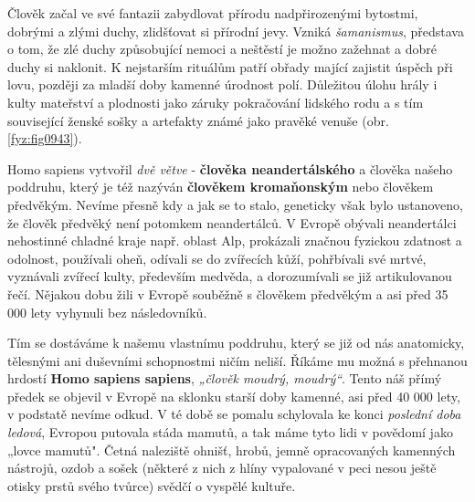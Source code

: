         Člověk začal ve své fantazii zabydlovat přírodu nadpřirozenými bytostmi, dobrými a zlými
        duchy, zlidšťovat si přírodní jevy. Vzniká \emph{šamanismus}, představa o tom, že zlé duchy
        způsobující nemoci a neštěstí je možno zažehnat a dobré duchy si naklonit. K nejstarším
        rituálům patří obřady mající zajistit úspěch při lovu, později za mladší doby kamenné
        úrodnost polí. Důležitou úlohu hrály i kulty mateřství a plodnosti jako záruky pokračování
        lidského rodu a s tím související ženské sošky a artefakty známé jako pravěké venuše (obr.
        \ref{fyz:fig0943}).


        Homo sapiens vytvořil \emph{dvě větve} - \textbf{člověka neandertálského} a člověka našeho
        poddruhu, který je též nazýván \textbf{člověkem kromaňonským} nebo člověkem předvěkým.
        Nevíme přesně kdy a jak se to stalo, geneticky však bylo ustanoveno, že člověk předvěký není
        potomkem neandertálců. V Evropě obývali neandertálci nehostinné chladné kraje např. oblast
        Alp, prokázali značnou fyzickou zdatnost a odolnost, používali oheň, odívali se do zvířecích
        kůží, pohřbívali své mrtvé, vyznávali zvířecí kulty, především medvěda, a dorozumívali se
        již artikulovanou řečí. Nějakou dobu žili v Evropě souběžně s člověkem předvěkým a asi před
        35 000 lety vyhynuli bez následovníků. 

        Tím se dostáváme k našemu vlastnímu poddruhu, který se již od nás anatomicky, tělesnými ani
        duševními schopnostmi ničím neliší. Říkáme mu možná s přehnanou hrdostí \textbf{Homo sapiens
        sapiens}, \emph{„člověk moudrý, moudrý“}. Tento náš přímý předek se objevil v Evropě na
        sklonku starší doby kamenné, asi před 40 000 lety, v podstatě nevíme odkud. V té době se
        pomalu schylovala ke konci \emph{poslední doba ledová}, Evropou putovala stáda mamutů, a tak
        máme tyto lidi v povědomí jako „lovce mamutů". Četná naleziště ohnišť, hrobů, jemně
        opracovaných kamenných nástrojů, ozdob a sošek (některé z nich z hlíny vypalované v peci
        nesou ještě otisky prstů svého tvůrce) svědčí o vyspělé kultuře. 

